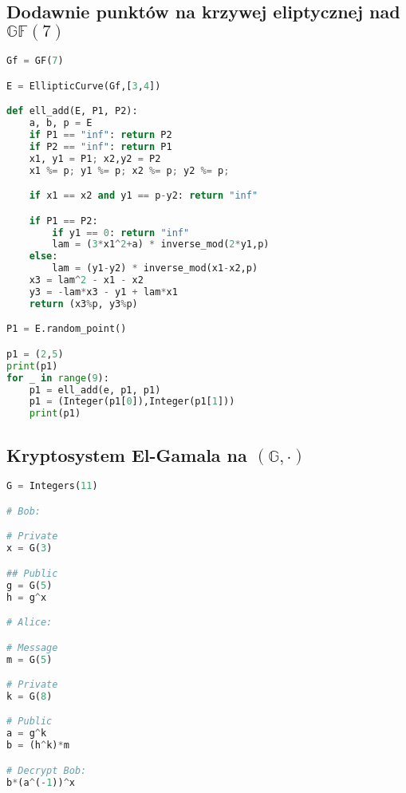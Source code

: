 \subsection{Dodawnie punktów na krzywej eliptycznej nad $\mathbb{GF}(7)$}
\begin{lstlisting}[language=python]
Gf = GF(7)

E = EllipticCurve(Gf,[3,4])

def ell_add(E, P1, P2):
    a, b, p = E
    if P1 == "inf": return P2
    if P2 == "inf": return P1
    x1, y1 = P1; x2,y2 = P2
    x1 %= p; y1 %= p; x2 %= p; y2 %= p;

    if x1 == x2 and y1 == p-y2: return "inf"

    if P1 == P2:
        if y1 == 0: return "inf"
        lam = (3*x1^2+a) * inverse_mod(2*y1,p)
    else:
        lam = (y1-y2) * inverse_mod(x1-x2,p)
    x3 = lam^2 - x1 - x2
    y3 = -lam*x3 - y1 + lam*x1
    return (x3%p, y3%p)

P1 = E.random_point()

p1 = (2,5)
print(p1)
for _ in range(9):
    p1 = ell_add(e, p1, p1)
    p1 = (Integer(p1[0]),Integer(p1[1]))
    print(p1)


\end{lstlisting}

\subsection{Kryptosystem El-Gamala na $(\mathbb{G}, \cdot)$}
\begin{lstlisting}[language=python]
G = Integers(11)

# Bob:

# Private
x = G(3)

## Public
g = G(5)
h = g^x

# Alice:

# Message
m = G(5)

# Private
k = G(8)

# Public
a = g^k
b = (h^k)*m

# Decrypt Bob:
b*(a^(-1))^x
\end{lstlisting}

